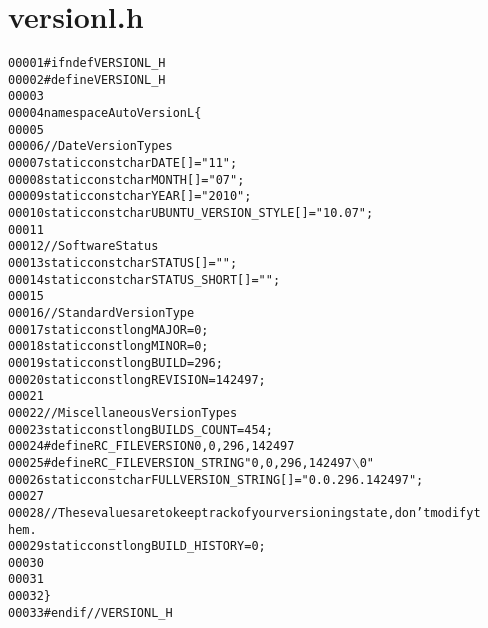 \hypertarget{versionl_8h_source}{
\section{versionl.h}
}


\begin{footnotesize}\begin{alltt}
00001 \textcolor{preprocessor}{#ifndef VERSIONL\_H}
00002 \textcolor{preprocessor}{}\textcolor{preprocessor}{#define VERSIONL\_H}
00003 \textcolor{preprocessor}{}
00004 \textcolor{keyword}{namespace }AutoVersionL\{
00005         
00006         \textcolor{comment}{//Date Version Types}
00007         \textcolor{keyword}{static} \textcolor{keyword}{const} \textcolor{keywordtype}{char} DATE[] = \textcolor{stringliteral}{"11"};
00008         \textcolor{keyword}{static} \textcolor{keyword}{const} \textcolor{keywordtype}{char} MONTH[] = \textcolor{stringliteral}{"07"};
00009         \textcolor{keyword}{static} \textcolor{keyword}{const} \textcolor{keywordtype}{char} YEAR[] = \textcolor{stringliteral}{"2010"};
00010         \textcolor{keyword}{static} \textcolor{keyword}{const} \textcolor{keywordtype}{char} UBUNTU\_VERSION\_STYLE[] = \textcolor{stringliteral}{"10.07"};
00011         
00012         \textcolor{comment}{//Software Status}
00013         \textcolor{keyword}{static} \textcolor{keyword}{const} \textcolor{keywordtype}{char} STATUS[] = \textcolor{stringliteral}{""};
00014         \textcolor{keyword}{static} \textcolor{keyword}{const} \textcolor{keywordtype}{char} STATUS\_SHORT[] = \textcolor{stringliteral}{""};
00015         
00016         \textcolor{comment}{//Standard Version Type}
00017         \textcolor{keyword}{static} \textcolor{keyword}{const} \textcolor{keywordtype}{long} MAJOR = 0;
00018         \textcolor{keyword}{static} \textcolor{keyword}{const} \textcolor{keywordtype}{long} MINOR = 0;
00019         \textcolor{keyword}{static} \textcolor{keyword}{const} \textcolor{keywordtype}{long} BUILD = 296;
00020         \textcolor{keyword}{static} \textcolor{keyword}{const} \textcolor{keywordtype}{long} REVISION = 142497;
00021         
00022         \textcolor{comment}{//Miscellaneous Version Types}
00023         \textcolor{keyword}{static} \textcolor{keyword}{const} \textcolor{keywordtype}{long} BUILDS\_COUNT = 454;
00024 \textcolor{preprocessor}{        #define RC\_FILEVERSION 0,0,296,142497}
00025 \textcolor{preprocessor}{}\textcolor{preprocessor}{        #define RC\_FILEVERSION\_STRING "0, 0, 296, 142497\(\backslash\)0"}
00026 \textcolor{preprocessor}{}        \textcolor{keyword}{static} \textcolor{keyword}{const} \textcolor{keywordtype}{char} FULLVERSION\_STRING[] = \textcolor{stringliteral}{"0.0.296.142497"};
00027         
00028         \textcolor{comment}{//These values are to keep track of your versioning state, don't modify t
      hem.}
00029         \textcolor{keyword}{static} \textcolor{keyword}{const} \textcolor{keywordtype}{long} BUILD\_HISTORY = 0;
00030         
00031 
00032 \}
00033 \textcolor{preprocessor}{#endif //VERSIONL\_H}
\end{alltt}\end{footnotesize}
